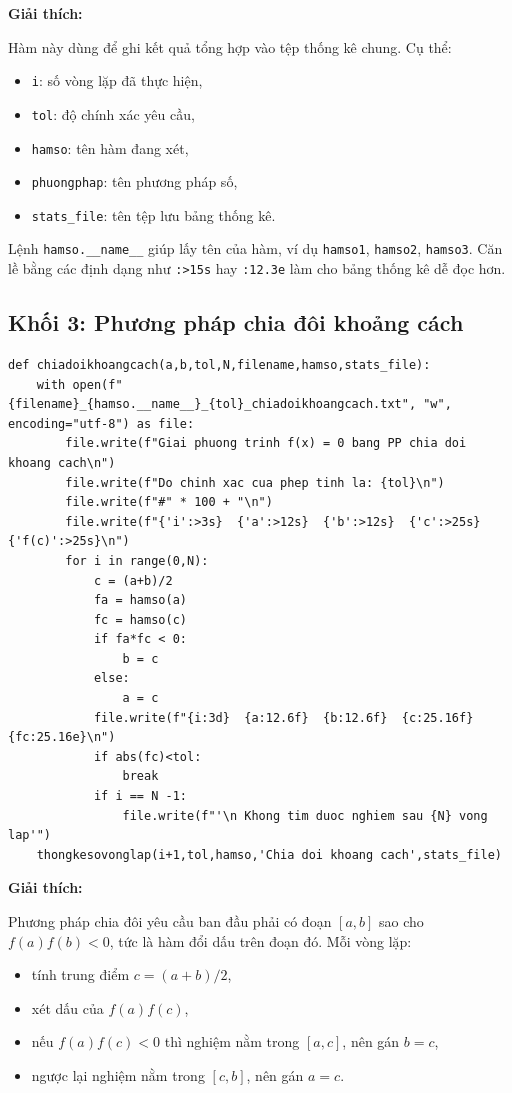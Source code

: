 \documentclass{article}
\begin{document}
\textbf{Giải thích:}

Hàm này dùng để ghi kết quả tổng hợp vào tệp thống kê chung. Cụ thể:
\begin{itemize}
    \item \texttt{i}: số vòng lặp đã thực hiện,
    \item \texttt{tol}: độ chính xác yêu cầu,
    \item \texttt{hamso}: tên hàm đang xét,
    \item \texttt{phuongphap}: tên phương pháp số,
    \item \texttt{stats\_file}: tên tệp lưu bảng thống kê.
\end{itemize}

Lệnh \texttt{hamso.\_\_name\_\_} giúp lấy tên của hàm, ví dụ \texttt{hamso1}, \texttt{hamso2}, \texttt{hamso3}. Căn lề bằng các định dạng như \texttt{:>15s} hay \texttt{:12.3e} làm cho bảng thống kê dễ đọc hơn.

\subsection{Khối 3: Phương pháp chia đôi khoảng cách}
\begin{lstlisting}[style=mypython,caption={Phương pháp chia đôi khoảng cách}]
def chiadoikhoangcach(a,b,tol,N,filename,hamso,stats_file):
    with open(f"{filename}_{hamso.__name__}_{tol}_chiadoikhoangcach.txt", "w", encoding="utf-8") as file:
        file.write(f"Giai phuong trinh f(x) = 0 bang PP chia doi khoang cach\n")
        file.write(f"Do chinh xac cua phep tinh la: {tol}\n")
        file.write(f"#" * 100 + "\n")
        file.write(f"{'i':>3s}  {'a':>12s}  {'b':>12s}  {'c':>25s}  {'f(c)':>25s}\n")
        for i in range(0,N):
            c = (a+b)/2
            fa = hamso(a)
            fc = hamso(c)
            if fa*fc < 0:
                b = c
            else:
                a = c
            file.write(f"{i:3d}  {a:12.6f}  {b:12.6f}  {c:25.16f}  {fc:25.16e}\n")
            if abs(fc)<tol:
                break
            if i == N -1:
                file.write(f"'\n Khong tim duoc nghiem sau {N} vong lap'")
    thongkesovonglap(i+1,tol,hamso,'Chia doi khoang cach',stats_file)
\end{lstlisting}

\textbf{Giải thích:}

Phương pháp chia đôi yêu cầu ban đầu phải có đoạn \([a,b]\) sao cho \(f(a)f(b)<0\), tức là hàm đổi dấu trên đoạn đó. Mỗi vòng lặp:
\begin{itemize}
    \item tính trung điểm \(c=(a+b)/2\),
    \item xét dấu của \(f(a)f(c)\),
    \item nếu \(f(a)f(c)<0\) thì nghiệm nằm trong \([a,c]\), nên gán \(b=c\),
    \item ngược lại nghiệm nằm trong \([c,b]\), nên gán \(a=c\).
\end{itemize}
\end{document}
